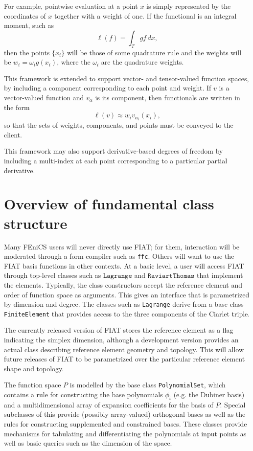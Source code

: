 For example, pointwise evaluation at a point \( x \) is simply represented
by the coordinates of \( x \) together with a weight of one. If the
functional is an integral moment, such as
\[
\ell( f ) = \int_T g f \, dx,
\]
then the points \( \{ x_i \} \) will be those of some quadrature rule and
the weights will be \( w_i = \omega_i g(x_i) \), where the \( \omega_i \)
are the quadrature weights.

This framework is extended to support vector- and tensor-valued function
spaces, by including a component corresponding to each point and weight.
If \( v \) is a vector-valued function and \( v_\alpha \) is its
component, then functionals are written in the form
\[
\ell( v ) \approx w_i v_{\alpha_i}(x_i),
\]
so that the sets of weights, components, and points must be conveyed to
the client.

This framework may also support derivative-based degrees of freedom
by including a multi-index at each point corresponding to a particular
partial derivative.


\section{Overview of fundamental class structure}

Many FEniCS users will never directly use FIAT; for them, interaction
will be moderated through a form compiler such as \texttt{ffc}.
Others will want to use the FIAT basis functions in other contexts.
At a basic level, a user will access FIAT through top-level classes
such as \( \texttt{Lagrange} \) and \( \texttt{RaviartThomas} \) that
implement the elements.  Typically, the class constructors accept the
reference element and order of function space as arguments.  This gives
an interface that is parametrized by dimension and degree.  The classes
such as \texttt{Lagrange} derive from a base class \texttt{FiniteElement}
that provides access to the three components of the Ciarlet triple.

The currently released version of FIAT stores the reference element
as a flag indicating the simplex dimension, although a development
version provides an actual class describing reference element geometry
and topology.  This will allow future releases of FIAT to be parametrized
over the particular reference element shape and topology.

The function space \( P \) is modelled by the base class
\texttt{PolynomialSet}, which contains a rule for constructing the base
polynomials \( \phi_i \) (e.g. the Dubiner basis) and a multidimensional
array of expansion coefficients for the basis of \( P \).  Special
subclasses of this provide (possibly array-valued) orthogonal bases as
well as the rules for constructing supplemented and constrained bases.
These classes provide mechanisms for tabulating and differentiating
the polynomials at input points as well as basic queries such as the
dimension of the space.

